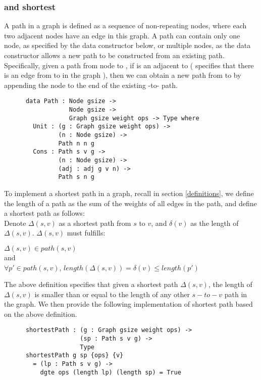 \subsubsection{ and shortest } \label{path}
A path in a graph is defined as a sequence of non-repeating nodes, where each two adjacent nodes have an edge in this graph. A path can contain only one node, as specified by the  data constructor below, or multiple nodes, as the  data constructor allows a new path to be constructed from an existing path. Specifically, given a path from node  to , if  is an adjacent to  ( specifies that there is an edge from  to  in the graph ), then we can obtain a new path from  to  by appending the node  to the end of the existing -to- path. 
\begin{lstlisting} 
      data Path : Node gsize ->
                  Node gsize ->
                  Graph gsize weight ops -> Type where
        Unit : (g : Graph gsize weight ops) ->
               (n : Node gsize) ->
               Path n n g
        Cons : Path s v g ->
               (n : Node gsize) ->
               (adj : adj g v n) ->
               Path s n g
\end{lstlisting}

To implement a shortest path in a graph, recall in section \ref{definitions}, we define the length of a path as the sum of the weights of all edges in the path, and define a shortest path as follows:
\\
\tab Denote $\Delta(s, v)$ as a shortest path from $s$ to $v$, and $\delta(v)$ as the length of $\Delta(s, v)$. $\Delta(s, v)$ must fulfills: 
\begin{center}
$\Delta(s, v) \in path(s, v)$ 
\\
and 
\\
$\forall p' \in path(s, v)$, $length(\Delta(s, v)) = \delta(v) \leq length(p')$
\end{center}

The above definition specifies that given a shortest path $\Delta(s, v)$, the length of $\Delta(s, v)$ is smaller than or equal to the length of any other $s-to-v$ path in the graph. We then provide the following implementation of shortest path based on the above definition. 

\begin{lstlisting}
      shortestPath : (g : Graph gsize weight ops) ->
                     (sp : Path s v g) ->
                     Type
      shortestPath g sp {ops} {v}
        = (lp : Path s v g) ->
          dgte ops (length lp) (length sp) = True
\end{lstlisting}

